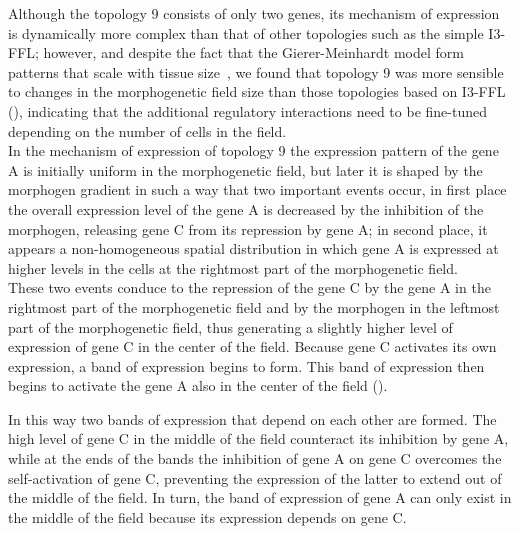 \documentclass[10pt,letterpaper]{article}
\begin{document}
Although the topology 9 consists of only two genes, its mechanism of expression
is dynamically more complex than that of other topologies such as the simple
I3-FFL; however, and despite the fact that the Gierer-Meinhardt model form
patterns that scale with tissue size~\cite{shoaf1984}, we found that topology 9
was more sensible to changes in the morphogenetic field size than those
topologies based on I3-FFL (),
indicating that the additional regulatory interactions need to be fine-tuned
depending on the number of cells in the field.\\

In the mechanism of expression of topology 9 the expression pattern of the
gene A is initially uniform in the
morphogenetic field, but later it is shaped by the morphogen gradient in such a
way that two important events occur, in first place the overall expression
level of the gene A is decreased by the inhibition of the morphogen, releasing
gene C from its repression by gene A; in second place, it appears a
non-homogeneous spatial distribution in which gene A is expressed at higher
levels in the cells at the rightmost part of the morphogenetic field.\\

These two events conduce to the repression of the gene C by the gene A in the
rightmost part of the morphogenetic field and by the morphogen in the leftmost
part of the morphogenetic field, thus generating a slightly higher level of
expression of gene C in the center of the field. Because gene C activates its
own expression, a band of expression begins to form. This band of expression
then begins to activate the gene A also in the center of the field
().


In this way two bands of expression that depend on each other are formed. The
high level of gene C in the middle of the field counteract its inhibition by
gene A, while at the ends of the bands the inhibition of gene A on gene C
overcomes the self-activation of gene C, preventing the expression of the
latter to extend out of the middle of the field. In turn, the band of
expression of gene A can only exist in the middle of the field because its
expression depends on gene C.
\end{document}
